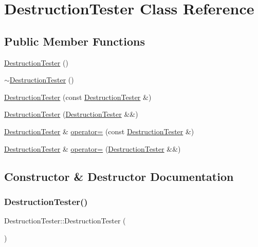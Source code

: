 \hypertarget{class_destruction_tester}{}\section{Destruction\+Tester Class Reference}
\label{class_destruction_tester}
\subsection*{Public Member Functions}
\begin{DoxyCompactItemize}
\item 
\mbox{\hyperlink{class_destruction_tester_ab9c828938509b32085ef1b30c0d724ba}{Destruction\+Tester}} ()
\item 
\mbox{\hyperlink{class_destruction_tester_a608860705a88621d6bf57bc47b3d5d69}{$\sim$\+Destruction\+Tester}} ()
\item 
\mbox{\hyperlink{class_destruction_tester_a40f59e229876a901711bf788b881ca25}{Destruction\+Tester}} (const \mbox{\hyperlink{class_destruction_tester}{Destruction\+Tester}} \&)
\item 
\mbox{\hyperlink{class_destruction_tester_a09b8acd42eefd9f9511519179f559986}{Destruction\+Tester}} (\mbox{\hyperlink{class_destruction_tester}{Destruction\+Tester}} \&\&)
\item 
\mbox{\hyperlink{class_destruction_tester}{Destruction\+Tester}} \& \mbox{\hyperlink{class_destruction_tester_a320ea89588fd7b6cd0f492854d16da89}{operator=}} (const \mbox{\hyperlink{class_destruction_tester}{Destruction\+Tester}} \&)
\item 
\mbox{\hyperlink{class_destruction_tester}{Destruction\+Tester}} \& \mbox{\hyperlink{class_destruction_tester_adcdeb26cc847f0f19894d6bcae51b9a0}{operator=}} (\mbox{\hyperlink{class_destruction_tester}{Destruction\+Tester}} \&\&)
\end{DoxyCompactItemize}


\subsection{Constructor \& Destructor Documentation}
\mbox{\label{class_destruction_tester_ab9c828938509b32085ef1b30c0d724ba}} 
\subsubsection{\texorpdfstring{DestructionTester()}{DestructionTester()}\hspace{0.1cm}{\footnotesize\ttfamily [1/3]}}
{\footnotesize\ttfamily Destruction\+Tester\+::\+Destruction\+Tester (\begin{DoxyParamCaption}{ }\end{DoxyParamCaption})\hspace{0.3cm}{\ttfamily [inline]}}


